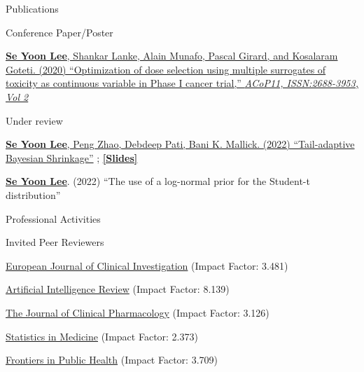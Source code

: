 \documentclass{resume} %
\begin{document}
\begin{rSection}{Publications}
\begin{rSubsection}{Conference Paper/Poster}{}{}{}
\item[] [1] 
\href{https://github.com/yain22/2PLD/blob/main/Poster/ACOP_Se_Yoon_Lee_PhD.pdf}{\underline{\textbf{Se Yoon Lee}}, Shankar Lanke, Alain Munafo, Pascal Girard, and Kosalaram Goteti. (2020)
``Optimization of dose selection using multiple surrogates of toxicity as continuous variable in Phase I cancer trial,'' \textit{ACoP11, ISSN:2688-3953, Vol 2}}
\end{rSubsection}



\begin{rSubsection}{Under review}{}{}{}
\item[] [1]
\href{https://arxiv.org/abs/2007.02192}
{\underline{\textbf{Se Yoon Lee}}, Peng Zhao, Debdeep Pati, Bani K. Mallick. (2022)
``Tail-adaptive Bayesian Shrinkage''}
;
\href{https://www.dropbox.com/s/5sx21h4guwl4dyz/Main_Doctoral_Dissertation_Work.pdf?dl=0}{\underline{\textbf{[Slides]}}}
\item[] [2]
\underline{\textbf{Se Yoon Lee}}. (2022)
``The use of a log-normal prior for the Student-t distribution''
\end{rSubsection}
\end{rSection}

\begin{rSection}{Professional Activities}
\begin{rSubsection}{
Invited Peer Reviewers}{}{}{}
\item \href{https://onlinelibrary.wiley.com/journal/13652362}{European Journal of Clinical Investigation} (Impact Factor: 3.481)
\item \href{https://www.springer.com/journal/10462}{Artificial Intelligence Review} (Impact Factor: 8.139)
\item \href{https://accp1.onlinelibrary.wiley.com/journal/15524604}{The Journal of Clinical Pharmacology} (Impact Factor: 3.126)
\item \href{https://onlinelibrary.wiley.com/journal/10970258}{Statistics in Medicine} (Impact Factor: 2.373)
\item \href{https://www.frontiersin.org/journals/public-health}{Frontiers in Public Health} (Impact Factor: 3.709)
\end{rSubsection}
\end{rSection}
\end{document}
